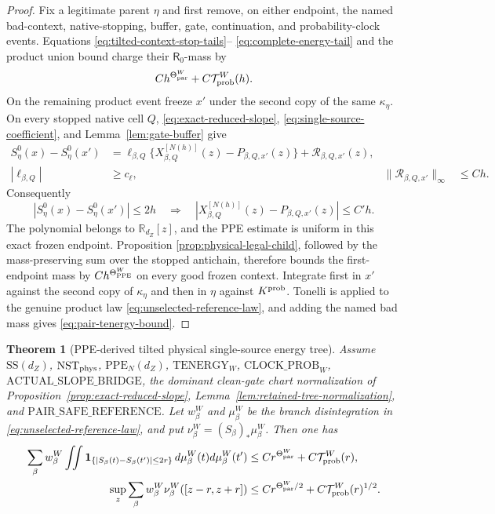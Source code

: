 \documentclass[11pt]{article}
\newtheorem{theorem}{Theorem}[section]
\begin{document}
\begin{proof}
Fix a legitimate parent $\eta$ and first remove, on either endpoint, the
named bad-context, native-stopping, buffer, gate, continuation, and
probability-clock events.  Equations
\eqref{eq:tilted-context-stop-tails}--
\eqref{eq:complete-energy-tail} and the product union bound charge their
$\mathsf R_0$-mass by
\[
 Ch^{\Theta_{\rm par}^{W}}+C\mathcal T_{\rm prob}^{W}(h).
\]
On the remaining product event freeze $x'$ under the second copy of the
same $\kappa_\eta$.  On every stopped native cell $Q$,
\eqref{eq:exact-reduced-slope},
\eqref{eq:single-source-coefficient}, and Lemma~\ref{lem:gate-buffer} give
\[
\begin{aligned}
 S_\eta^0(x)-S_\eta^0(x')
 &=\ell_{\beta,Q}
   \{X_{\beta,Q}^{[N(h)]}(z)-P_{\beta,Q,x'}(z)\}
   +\mathcal R_{\beta,Q,x'}(z),\\
 |\ell_{\beta,Q}|&\ge c_\ell,
 &\|\mathcal R_{\beta,Q,x'}\|_\infty&\le Ch.
\end{aligned}
\]
Consequently
\[
 |S_\eta^0(x)-S_\eta^0(x')|\le2h
 \quad\Longrightarrow\quad
 |X_{\beta,Q}^{[N(h)]}(z)-P_{\beta,Q,x'}(z)|\le C'h.
\]
The polynomial belongs to $\mathbb R_{d_Z}[z]$, and the PPE estimate is
uniform in this exact frozen endpoint.  Proposition
\ref{prop:physical-legal-child}, followed by the mass-preserving sum over
the stopped antichain, therefore bounds the first-endpoint mass by
$Ch^{\Theta_{\rm PPE}^{W}}$ on every good frozen context.  Integrate first
in $x'$ against the second copy of $\kappa_\eta$ and then in $\eta$ against
$K^{\rm prob}$.  Tonelli is applied to the genuine product law
\eqref{eq:unselected-reference-law}, and adding the named bad mass gives
\eqref{eq:pair-tenergy-bound}.
\end{proof}

\begin{theorem}[PPE-derived tilted physical single-source energy tree]
\label{thm:direct-slope-small-ball}
Assume $\mathrm{SS}(d_Z)$, $\mathrm{NST}_{\rm phys}$,
$\mathrm{PPE}_{N}(d_Z)$, $\mathrm{TENERGY}_{W}$,
$\mathrm{CLOCK\_PROB}_{W}$,
$\mathrm{ACTUAL\_SLOPE\_BRIDGE}$, the dominant clean-gate chart
normalization of Proposition~\ref{prop:exact-reduced-slope},
Lemma~\ref{lem:retained-tree-normalization}, and
$\mathrm{PAIR\_SAFE\_REFERENCE}$.  Let $w_\beta^{W}$ and $\mu_\beta^{W}$ be the
branch disintegration in \eqref{eq:unselected-reference-law}, and put
$\nu_\beta^{W}=(S_\beta)_*\mu_\beta^{W}$.  Then
one has
\begin{align}
 \sum_\beta w_\beta^{W}\iint
   \mathbf 1_{\{|S_\beta(t)-S_\beta(t')|\le2r\}}
   \,d\mu_\beta^{W}(t)d\mu_\beta^{W}(t')
 &\le Cr^{\Theta_{\rm par}^{W}}+C\mathcal T_{\rm prob}^{W}(r),\label{eq:conditional-energy-bound}\\
 \sup_z\sum_\beta w_\beta^{W}\nu_\beta^{W}([z-r,z+r])
 &\le Cr^{\Theta_{\rm par}^{W}/2}+C\mathcal T_{\rm prob}^{W}(r)^{1/2}.
 \label{eq:slope-value-small-ball}
\end{align}
\end{theorem}
\end{document}
